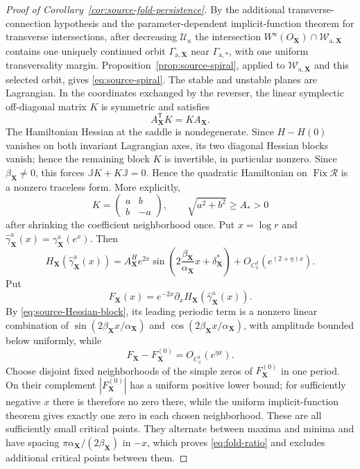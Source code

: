 \documentclass[11pt]{amsart}
\numberwithin{equation}{section}
\theoremstyle{definition}
\theoremstyle{remark}
\newcommand{\J}{\mathbb J}
\newcommand{\cR}{\mathcal R}
\newcommand{\cU}{\mathcal U}
\newcommand{\Fix}{\operatorname {Fix}}
\begin{document}
\begin{proof}[Proof of Corollary~\ref{cor:source-fold-persistence}]
By the additional transverse-connection hypothesis and the
parameter-dependent implicit-function theorem for transverse
intersections, after decreasing
$\cU_\kappa$ the intersection
$W^u(O_{\mathbf X})\cap\mathcal W_{\mathrm a,\mathbf X}$ contains one
uniquely continued orbit $\Gamma_{\mathrm a,\mathbf X}$ near
$\Gamma_{\mathrm a,*}$, with one uniform transversality margin.
Proposition~\ref{prop:source-spiral}, applied to
$\mathcal W_{\mathrm a,\mathbf X}$ and this selected orbit, gives
\eqref{eq:source-spiral}.  The stable and unstable planes are Lagrangian.
In the coordinates exchanged by the reverser, the linear symplectic
off-diagonal matrix $K$ is symmetric and satisfies
\begin{equation}\label{eq:linear-Hamiltonian-relation}
 A_{\mathbf X}^{\mathsf T}K=KA_{\mathbf X}.
\end{equation}
The Hamiltonian Hessian at the saddle is nondegenerate.  Since $H-H(0)$
vanishes on both invariant Lagrangian axes, its two diagonal Hessian blocks
vanish; hence the remaining block $K$ is invertible, in particular nonzero.
Since $\beta_{\mathbf X}\ne0$, this forces
$\J K+K\J=0$.  Hence the quadratic Hamiltonian on $\Fix\cR$ is a nonzero
traceless form.  More explicitly,
\begin{equation}\label{eq:source-Hessian-block}
 K=\begin{pmatrix}a&b\\ b&-a\end{pmatrix},
 \qquad \sqrt{a^2+b^2}\ge A_*>0
\end{equation}
after shrinking the coefficient neighborhood once.  Put $x=\log r$ and
$\widehat\gamma_{\mathbf X}^{\mathrm a}(x)
=\gamma_{\mathbf X}^{\mathrm a}(e^x)$.  Then
\begin{equation}\label{eq:fold-sinusoid}
 H_{\mathbf X}(\widehat\gamma_{\mathbf X}^{\mathrm a}(x))
 =A_{\mathbf X}^He^{2x}
   \sin\!\left(2\frac{\beta_{\mathbf X}}{\alpha_{\mathbf X}}x
       +\delta_{\mathbf X}^*\right)
 +O_{C_x^2}(e^{(2+\eta)x}).
\end{equation}
Put
\[
 F_{\mathbf X}(x)
   =e^{-2x}\partial_xH_{\mathbf X}
       (\widehat\gamma_{\mathbf X}^{\mathrm a}(x)).
\]
By \eqref{eq:source-Hessian-block}, its leading periodic term is a nonzero
linear combination of
$\sin(2\beta_{\mathbf X}x/\alpha_{\mathbf X})$ and
$\cos(2\beta_{\mathbf X}x/\alpha_{\mathbf X})$, with amplitude bounded
below uniformly, while
\[
 F_{\mathbf X}-F_{\mathbf X}^{(0)}
   =O_{C_x^1}(e^{\eta x}).
\]
Choose disjoint fixed neighborhoods of the simple zeros of
$F_{\mathbf X}^{(0)}$ in one period.  On their complement
$|F_{\mathbf X}^{(0)}|$ has a uniform positive lower bound; for sufficiently
negative $x$ there is therefore no zero there, while the uniform
implicit-function theorem gives exactly one zero in each chosen
neighborhood.  These are all sufficiently small critical points.  They
alternate between maxima and minima and have spacing
$\pi\alpha_{\mathbf X}/(2\beta_{\mathbf X})$ in $-x$, which proves
\eqref{eq:fold-ratio} and excludes additional critical points between them.
\end{proof}
\end{document}
